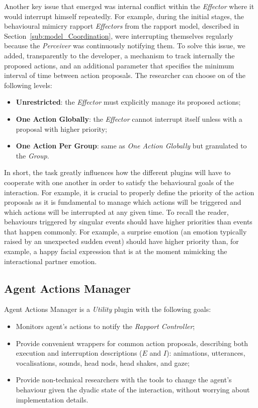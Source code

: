 Another key issue that emerged was internal conflict within the \textit{Effector} where it would interrupt himself repeatedly. For example, during the initial stages, the behavioural mimicry rapport \textit{Effectors} from the rapport model, described in Section~\ref{sub:model_Coordination}, were interrupting themselves regularly because the \textit{Perceiver} was continuously notifying them. To solve this issue, we added, transparently to the developer, a mechanism to track internally the proposed actions, and an additional parameter that specifies the minimum interval of time between action proposals. The researcher can choose on of the following levels:

\begin{itemize}
	\item \textbf{Unrestricted}: the \textit{Effector} must explicitly manage its proposed actions;
	\item \textbf{One Action Globally}: the \textit{Effector} cannot interrupt itself unless with a proposal with higher priority;
	\item \textbf{One Action Per Group}: same as \textit{One Action Globally} but granulated to the \textit{Group}.
\end{itemize}

In short, the task greatly influences how the different plugins will have to cooperate with one another in order to satisfy the behavioural goals of the interaction. For example, it is crucial to properly define the priority of the action proposals as it is fundamental to manage which actions will be triggered and which actions will be interrupted at any given time. To recall the reader, behaviours triggered by singular events should have higher priorities than events that happen commonly. For example, a surprise emotion (an emotion typically raised by an unexpected sudden event) should have higher priority than, for example, a happy facial expression that is at the moment mimicking the interactional partner emotion.

\subsection{Agent Actions Manager}
\label{sub:sec:agentActionsManager}


Agent Actions Manager is a \textit{Utility} plugin with the following goals:
\begin{itemize}
	\item Monitors agent's actions to notify the \textit{Rapport Controller};
	\item Provide convenient wrappers for common action proposals, describing both execution and interruption descriptions ($E$ and $I$): animations, utterances, vocalisations, sounds, head nods, head shakes, and gaze;
	\item Provide non-technical researchers with the tools to change the agent's behaviour given the dyadic state of the interaction, without worrying about implementation details.
\end{itemize}

